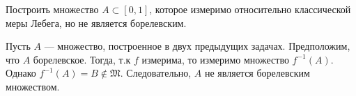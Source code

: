 \begin{task}{12}
Построить множество $A \subset [0, 1]$, которое измеримо относительно классической меры Лебега, но не является борелевским.
\end{task}

\begin{solution}
Пусть $A$ --- множество, построенное в двух предыдущих задачах. Предположим, что $A$ борелевское. Тогда, т.к $f$ измерима, то измеримо множество $f^{-1}(A)$. Однако $f^{-1}(A) = B \notin \mathfrak{M}$. Следовательно, $A$ не является борелевским множеством.
\end{solution}